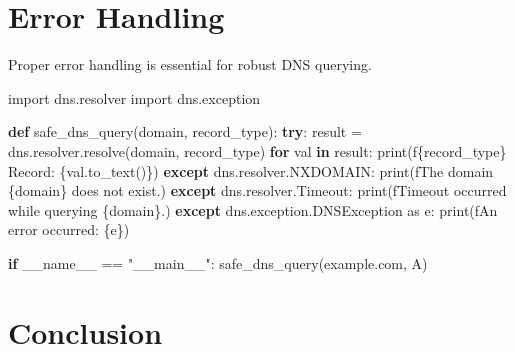 \documentclass[
  letterpaper,
  DIV=11,
  numbers=noendperiod]{scrreprt}
\newenvironment{Shaded}{\begin{snugshade}}{\end{snugshade}}
\newcommand{\BuiltInTok}[1]{\textcolor[rgb]{0.00,0.23,0.31}{#1}}
\newcommand{\ControlFlowTok}[1]{\textcolor[rgb]{0.00,0.23,0.31}{\textbf{#1}}}
\newcommand{\ImportTok}[1]{\textcolor[rgb]{0.00,0.46,0.62}{#1}}
\newcommand{\KeywordTok}[1]{\textcolor[rgb]{0.00,0.23,0.31}{\textbf{#1}}}
\newcommand{\NormalTok}[1]{\textcolor[rgb]{0.00,0.23,0.31}{#1}}
\newcommand{\OperatorTok}[1]{\textcolor[rgb]{0.37,0.37,0.37}{#1}}
\newcommand{\SpecialCharTok}[1]{\textcolor[rgb]{0.37,0.37,0.37}{#1}}
\newcommand{\SpecialStringTok}[1]{\textcolor[rgb]{0.13,0.47,0.30}{#1}}
\newcommand{\StringTok}[1]{\textcolor[rgb]{0.13,0.47,0.30}{#1}}
\newcommand{\VariableTok}[1]{\textcolor[rgb]{0.07,0.07,0.07}{#1}}
\begin{document}
\section{Error Handling}\label{error-handling-4}

Proper error handling is essential for robust DNS querying.

\begin{Shaded}
\begin{Highlighting}[]
\ImportTok{import}\NormalTok{ dns.resolver}
\ImportTok{import}\NormalTok{ dns.exception}

\KeywordTok{def}\NormalTok{ safe\_dns\_query(domain, record\_type):}
    \ControlFlowTok{try}\NormalTok{:}
\NormalTok{        result }\OperatorTok{=}\NormalTok{ dns.resolver.resolve(domain, record\_type)}
        \ControlFlowTok{for}\NormalTok{ val }\KeywordTok{in}\NormalTok{ result:}
            \BuiltInTok{print}\NormalTok{(}\SpecialStringTok{f\textquotesingle{}}\SpecialCharTok{\{}\NormalTok{record\_type}\SpecialCharTok{\}}\SpecialStringTok{ Record: }\SpecialCharTok{\{}\NormalTok{val}\SpecialCharTok{.}\NormalTok{to\_text()}\SpecialCharTok{\}}\SpecialStringTok{\textquotesingle{}}\NormalTok{)}
    \ControlFlowTok{except}\NormalTok{ dns.resolver.NXDOMAIN:}
        \BuiltInTok{print}\NormalTok{(}\SpecialStringTok{f\textquotesingle{}The domain }\SpecialCharTok{\{}\NormalTok{domain}\SpecialCharTok{\}}\SpecialStringTok{ does not exist.\textquotesingle{}}\NormalTok{)}
    \ControlFlowTok{except}\NormalTok{ dns.resolver.Timeout:}
        \BuiltInTok{print}\NormalTok{(}\SpecialStringTok{f\textquotesingle{}Timeout occurred while querying }\SpecialCharTok{\{}\NormalTok{domain}\SpecialCharTok{\}}\SpecialStringTok{.\textquotesingle{}}\NormalTok{)}
    \ControlFlowTok{except}\NormalTok{ dns.exception.DNSException }\ImportTok{as}\NormalTok{ e:}
        \BuiltInTok{print}\NormalTok{(}\SpecialStringTok{f\textquotesingle{}An error occurred: }\SpecialCharTok{\{}\NormalTok{e}\SpecialCharTok{\}}\SpecialStringTok{\textquotesingle{}}\NormalTok{)}

\ControlFlowTok{if} \VariableTok{\_\_name\_\_} \OperatorTok{==} \StringTok{"\_\_main\_\_"}\NormalTok{:}
\NormalTok{    safe\_dns\_query(}\StringTok{\textquotesingle{}example.com\textquotesingle{}}\NormalTok{, }\StringTok{\textquotesingle{}A\textquotesingle{}}\NormalTok{)}
\end{Highlighting}
\end{Shaded}

\section{Conclusion}\label{conclusion-36}
\end{document}
